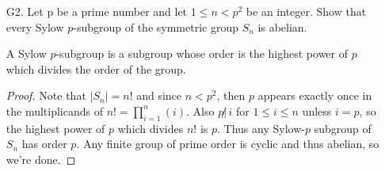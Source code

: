 \documentclass[12pt,letterpaper]{article}
\begin{document}
\begin{enumerate}
\begin{enumerate}[label=(\alph*)]
\item Is the converse of part (a) true? Give a reason.
\begin{proof}
Yes, by Lagrange's theorem. If $|G|=p$ prime, any subgroup either has order $p$ or is trivial. 
\end{proof}
\end{enumerate} 
\item[G2.] Let p be a prime number and let $1 \leq n < p^2$ be an integer. Show that every Sylow $p$-subgroup of the symmetric group $S_n$ is abelian.
\begin{definition*}
A Sylow $p$-subgroup is a subgroup whose order is the highest power of $p$ which divides the order of the group. 
\end{definition*}
\begin{proof}
Note that $|S_n|=n!$ and since $n<p^2$, then $p$ appears exactly once in the multiplicands of $n!=\prod_{i=1}^n (i)$. Also $p\!\not|\, i$ for $1\leq i \leq n$ unless $i=p$, so the highest power of $p$ which divides $n!$ is $p$. Thus any Sylow-$p$ subgroup of $S_n$ has order $p$. Any finite group of prime order is cyclic and thus abelian, so we're done. 
\end{proof}
\end{enumerate} 
	
\end{document}
